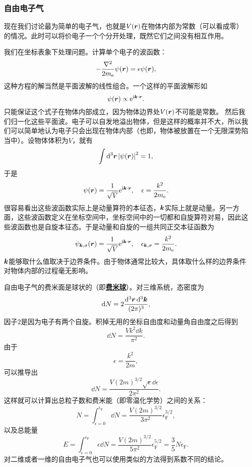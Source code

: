 \documentclass[hyperref, UTF8, a4paper]{ctexart}
\newcommand*{\ii}{\mathrm{i}}
\newcommand*{\ee}{\mathrm{e}}
\newcommand*{\concept}[1]{\underline{\textbf{#1}}}
\begin{document}
\subsubsection{自由电子气}

现在我们讨论最为简单的电子气，也就是$V(\vb*{r})$在物体内部为常数（可以看成零）的情况。此时可以将价电子一个个分开处理，既然它们之间没有相互作用。

我们在坐标表象下处理问题。计算单个电子的波函数：
\[
    - \frac{\laplacian}{2m_\text{e}} \psi(\vb*{r}) = \epsilon \psi(\vb*{r}),
\]
这种方程的解当然是平面波解的线性组合。一个这样的平面波解形如
\[
    \psi(\vb*{r}) \propto \ee^{\ii \vb*{k} \cdot \vb*{r}}.
\]
只能保证这个式子在物体内部成立，因为物体边界处$V(\vb*{r})$不可能是常数。
然后我们归一化这些平面波。电子可以自发地溢出物体，但是这样的概率并不大，所以我们可以简单地认为电子只会出现在物体内部（也即，物体被放置在一个无限深势陷当中）。设物体体积为$V$，就有
\[
    \int \dd[3]{\vb*{r}} \abs{\psi(\vb*{r})}^2 = 1,
\]
于是
\[
    \psi (\vb*{r}) = \frac{1}{\sqrt{V}} \ee^{\ii \vb*{k} \cdot \vb*{r}}, \quad \epsilon = \frac{k^2}{2m_\text{e}}.
\]
很容易看出这些波函数实际上是动量算符的本征态，$\vb*{k}$实际上就是动量。另一方面，这些波函数定义在坐标空间中，坐标空间中的一切都和自旋算符对易，因此这些波函数也是自旋本征态。于是动量和自旋的一组共同正交本征函数为
\begin{equation}
    \psi_{\vb*{k},\sigma} (\vb*{r}) = \frac{1}{\sqrt{V}} \ee^{\ii \vb*{k} \cdot \vb*{r}}, \quad \epsilon_{\vb*{k},\sigma} = \frac{k^2}{2m_\text{e}}.
\end{equation}
$\vb*{k}$能够取什么值取决于边界条件。由于物体通常比较大，具体取什么样的边界条件对物体内部的过程毫无影响。

自由电子气的费米面是球状的（即\concept{费米球}）。对三维系统，态密度为
\[
    \dd{N} = 2 \frac{\dd[3]{\vb*{r}} \dd[3]{\vb*{k}}}{(2\pi)^3},
\]
因子$2$是因为电子有两个自旋。积掉无用的坐标自由度和动量角自由度之后得到
\[
    \dd{N} = \frac{V k^2 \dd{k}}{\pi^2}.
\]
由于
\[
    \epsilon = \frac{k^2}{2m},
\]
可以推导出
\[
    \dd{N} = \frac{V (2m)^{3/2} \sqrt{\epsilon} \dd{\epsilon}}{2 \pi^2}.
\]
这样就可以计算出总粒子数和费米能（即零温化学势）之间的关系：
\begin{equation}
    N = \int_{\epsilon=0}^{\epsilon_{\text{F}}} \dd{N} = \frac{V (2m)^{3/2}}{3 \pi^2} \epsilon_\text{F}^{3/2},
\end{equation}
以及总能量
\begin{equation}
    E = \int_{\epsilon=0}^{\epsilon_{\text{F}}} \epsilon \dd{N} = \frac{V (2m)^{3/2}}{5 \pi^2} \epsilon_\text{F}^{5/2} = \frac{3}{5} N \epsilon_{\text{F}}.
\end{equation}
对二维或者一维的自由电子气也可以使用类似的方法得到系数不同的结论。
\end{document}
